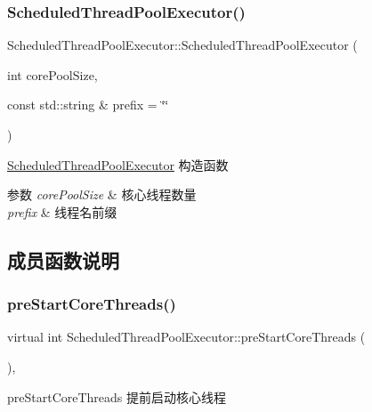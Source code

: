 \subsubsection{\texorpdfstring{Scheduled\+Thread\+Pool\+Executor()}{ScheduledThreadPoolExecutor()}}
{\footnotesize\ttfamily Scheduled\+Thread\+Pool\+Executor\+::\+Scheduled\+Thread\+Pool\+Executor (\begin{DoxyParamCaption}\item[{int}]{core\+Pool\+Size,  }\item[{const std\+::string \&}]{prefix = {\ttfamily \char`\"{}\char`\"{}} }\end{DoxyParamCaption})\hspace{0.3cm}{\ttfamily [inline]}}



\hyperlink{classScheduledThreadPoolExecutor}{Scheduled\+Thread\+Pool\+Executor} 构造函数 


\begin{DoxyParams}{参数}
{\em core\+Pool\+Size} & 核心线程数量 \\
\hline
{\em prefix} & 线程名前缀 \\
\hline
\end{DoxyParams}


\subsection{成员函数说明}
\mbox{\label{classScheduledThreadPoolExecutor_aed48379bdc243fd07e593205ca28f48d}} 
\subsubsection{\texorpdfstring{pre\+Start\+Core\+Threads()}{preStartCoreThreads()}}
{\footnotesize\ttfamily virtual int Scheduled\+Thread\+Pool\+Executor\+::pre\+Start\+Core\+Threads (\begin{DoxyParamCaption}{ }\end{DoxyParamCaption})\hspace{0.3cm}{\ttfamily [inline]}, {\ttfamily [virtual]}}



pre\+Start\+Core\+Threads 提前启动核心线程 

